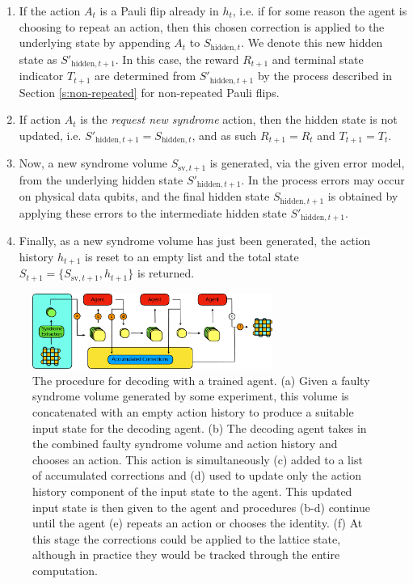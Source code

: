 \documentclass[twocolumn,preprintnumbers,amsmath,amssymb,notitlepage,nofootinbib,longbibliography,superscriptaddress,aps,pra,10pt]{revtex4-1}
\begin{document}
	\begin{enumerate}
		\item If the action $A_t$ is a Pauli flip already in $h_t$, i.e. if for some reason the agent is choosing to repeat an action, then this chosen correction is applied to the underlying state by appending $A_t$ to $S_{\mathrm{hidden},t}$. We denote this new hidden state as $S'_{\mathrm{hidden},t+1}$.  In this case, the reward $R_{t+1}$ and terminal state indicator $T_{t+1}$ are determined from $S'_{\mathrm{hidden},t+1}$  by the process described in Section \ref{s:non-repeated} for non-repeated Pauli flips.
		\item If action $A_t$ is the \emph{request new syndrome} action, then the hidden state is not updated, i.e. $S'_{\mathrm{hidden},t+1} = S_{\mathrm{hidden},t}$, and as such $R_{t+1} = R_{t}$ and $T_{t+1} = T_t$.
		\item Now, a new syndrome volume $S_{\mathrm{sv},t+1}$ is generated, via the given error model, from the underlying hidden state $S'_{\mathrm{hidden},t+1}$. In the process errors may occur on physical data qubits, and the final hidden state $S_{\mathrm{hidden},t+1}$ is obtained by applying these errors to the intermediate hidden state $S'_{\mathrm{hidden},t+1}$.
		\item Finally, as a new syndrome volume has just been generated, the action history $h_{t+1}$ is reset to an empty list and the total state $S_{t+1} = \{S_{\mathrm{sv},t+1},h_{t+1}\}$ is returned.
	\end{enumerate}

	\begin{figure}
	\centering
	\includegraphics[width=0.7\textwidth]{figures/agent_decoding.pdf}
	\caption{The procedure for decoding with a trained agent.
			(a) Given a faulty syndrome volume generated by some experiment, this volume is concatenated with an empty action history to produce a suitable input state for the decoding agent.
			(b) The decoding agent takes in the combined faulty syndrome volume and action history and chooses an action.
			This action is simultaneously (c) added to a list of accumulated corrections and (d) used to update only the action history component of the input state to the agent.
			This updated input state is then given to the agent and procedures (b-d) continue until the agent (e) repeats an action or chooses the identity.
			(f) At this stage the corrections could be applied to the lattice state, although in practice they would be tracked through the entire computation.
		}
		\label{agent_decoding}
	\end{figure}
\end{document}
